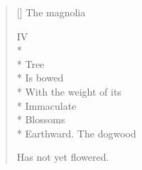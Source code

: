 \begin{verse}[\versewidth]
The magnolia 

\hspace{0.45\versewidth} IV\\*
~\\*
Tree\\*
Is bowed\\*
With the weight of its\\*
Immaculate\\*
Blossoms\\*
Earthward.\hspace{3\vgap} The dogwood

Has not yet flowered.
\end{verse}
